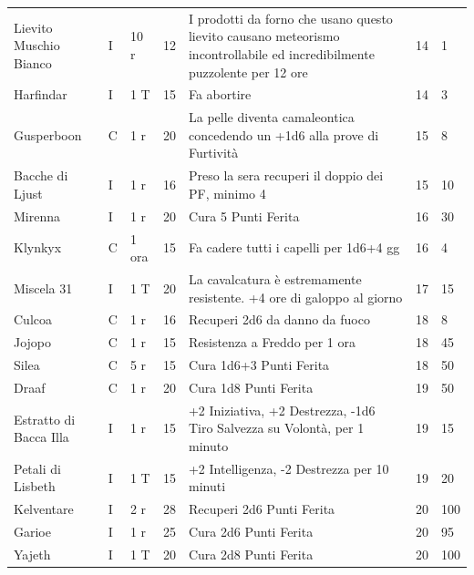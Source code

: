 \begin{xltabular}{\linewidth}{llllXll}
	Lievito Muschio Bianco & I& 10 r& 12& I prodotti da forno che usano questo lievito causano meteorismo incontrollabile ed incredibilmente puzzolente per 12 ore & 14 & 1\\

	Harfindar & I& 1 T & 15& Fa abortire& 14 & 3 \\

	Gusperboon & C& 1 r & 20& La pelle diventa camaleontica concedendo un +1d6 alla prove di Furtività & 15 & 8\\

	Bacche di Ljust & I& 1 r & 16& Preso la sera recuperi il doppio dei PF, minimo 4 & 15 & 10 \\

	Mirenna & I& 1 r & 20& Cura 5 Punti Ferita& 16 & 30 \\

	Klynkyx & C& 1 ora & 15& Fa cadere tutti i capelli per 1d6+4 gg & 16 & 4\\

	Miscela 31 & I& 1 T & 20&La cavalcatura è estremamente resistente. +4 ore di galoppo al giorno & 17 & 15\\

	Culcoa & C& 1 r & 16& Recuperi 2d6 da danno da fuoco & 18 & 8 \\

	Jojopo & C& 1 r & 15& Resistenza a Freddo per 1 ora & 18 & 45 \\

	Silea & C& 5 r& 15& Cura 1d6+3 Punti Ferita & 18 & 50 \\

	Draaf & C& 1 r & 20& Cura 1d8 Punti Ferita& 19 & 50 \\

	Estratto di Bacca Illa & I& 1 r & 15& +2 Iniziativa, +2 Destrezza, -1d6 Tiro Salvezza su Volontà, per 1 minuto& 19 & 15\\

	Petali di Lisbeth & I& 1 T & 15&+2 Intelligenza, -2 Destrezza per 10 minuti & 19 & 20 \\

	Kelventare & I& 2 r & 28& Recuperi 2d6 Punti Ferita & 20 & 100 \\

	Garioe & I& 1 r & 25& Cura 2d6 Punti Ferita& 20 & 95 \\

	Yajeth & I& 1 T& 20& Cura 2d8 Punti Ferita& 20 & 100 \\


\end{xltabular}
